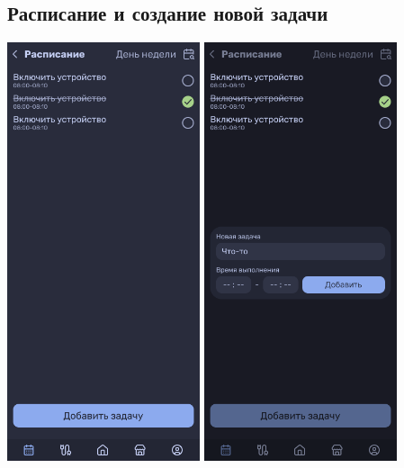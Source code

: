 \documentclass[a4paper,12pt]{article}
\begin{document}
\subsection*{Расписание и создание новой задачи}
\begin{center}
  \includegraphics[width=0.425\textwidth]{pics/Calendar Page.png}
  \includegraphics[width=0.425\textwidth]{pics/Calendar Page-1.png}
\end{center}
\end{document}
